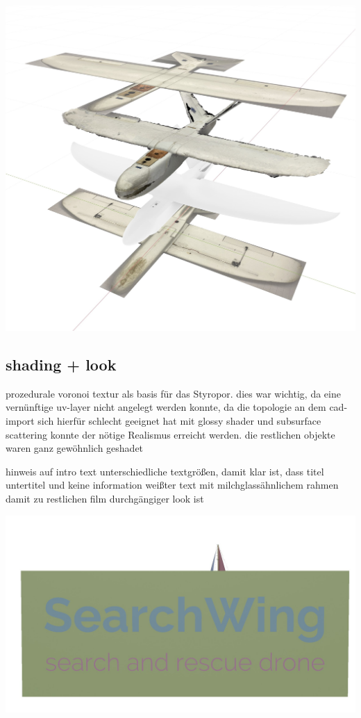 \includegraphics[width=\textwidth]{gfx/prod/plane/plane5.jpg}
\subsection{shading + look}

prozedurale voronoi textur als basis für das Styropor. 
dies war wichtig, da eine vernünftige uv-layer nicht angelegt werden konnte, da die topologie an dem cad-import sich hierfür schlecht geeignet hat
mit glossy shader und subsurface scattering konnte der nötige Realismus erreicht werden.
die restlichen objekte waren ganz gewöhnlich geshadet

hinweis auf intro text
unterschiedliche textgrößen, damit klar ist, dass titel untertitel und keine information
weißter text mit milchglassähnlichem rahmen damit zu restlichen film durchgängiger look ist

\includegraphics[width=\textwidth]{gfx/prod/env/intro_text.jpg}


